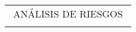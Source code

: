 \begin{adjustbox}{angle=90, captionbelow={DFMEA (Parte 1).}, float={table}[H]}

\setlength\arrayrulewidth{0.5pt}
\centering
\begin{tabular}{|ccccccccccccc|}
\hline
\multicolumn{13}{|c|}{ANÁLISIS DE RIESGOS}                                                                                                                                                                                                                                                                                                                                                                                                                                                                                                                                                                                                                                                                                                                                                                                                                                                                                                                                                                                                                                             \\
\multicolumn{1}{|l}{}                                              & \multicolumn{1}{l}{}                                                                                                      & \multicolumn{1}{l}{}                                                                                                      & \multicolumn{1}{l}{}                                                                                                                                    & \multicolumn{1}{l}{}                            & \multicolumn{1}{l}{}                            & \multicolumn{1}{l}{}                            & \multicolumn{1}{l}{}                            & \multicolumn{1}{l}{}                                                                                                                                                                                 & \multicolumn{1}{l}{}                            & \multicolumn{1}{l}{}                            & \multicolumn{1}{l}{}                            & \multicolumn{1}{l|}{}      \\ \cline{2-8}

\end{tabular}
\end{adjustbox}
